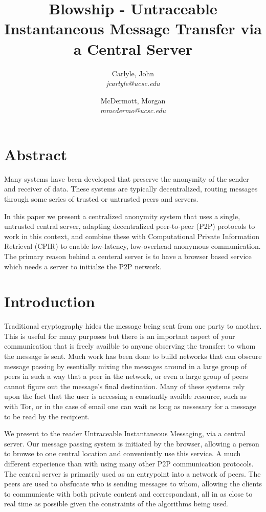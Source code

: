 \documentclass[twocolumn,11pt,english]{paper}
\title{Blowship - Untraceable Instantaneous Message Transfer via a Central Server}
\author{
  Carlyle, John\\
  \textit{jcarlyle@ucsc.edu}
  \and
  McDermott, Morgan\\
  \textit{mmcdermo@ucsc.edu}
}
\begin{document}
\maketitle

\section*{Abstract} 
Many systems have been developed that preserve the anonymity of the sender and receiver of data. These systems are typically decentralized, routing messages through some series of trusted or untrusted peers and servers. 

In this paper we present a centralized anonymity system that uses a single, untrusted central server, adapting decentralized peer-to-peer (P2P) protocols to work in this context, and combine these with Computational Private Information Retrieval (CPIR) to enable low-latency, low-overhead anonymous communication. The primary reason behind a centeral server is to have a browser based service which needs a server to initialze the P2P network.

\section{Introduction}

Traditional cryptography hides the message being sent from one party to another. This is useful for many purposes but there is an important aspect of your communication that is freely availble to anyone observing the transfer: to whom the message is sent. Much work has been done to build networks that can obscure message passing by esentially mixing the messages around in a large group of peers in such a way that a peer in the network, or even a large group of peers cannot figure out the message's final destination. Many of these systems rely upon the fact that the user is accessing a constantly avaible resource, such as with Tor\cite{tor-design}, or in the case of email one can wait as long as nessesary for a message to be read by the recipient.

We present to the reader Untraceable Instantaneous Messaging, via a central server. Our message passing system is initiated by the browser, allowing a person to browse to one central location and conveniently use this service. A much different experience than with using many other P2P communication protocols. The central server is primarily used as an entrypoint into a network of peers. The peers are used to obsfucate who is sending messages to whom, allowing the clients to communicate with both private content and correspondant, all in as close to real time as possible given the constraints of the algorithms being used.
\end{document}
